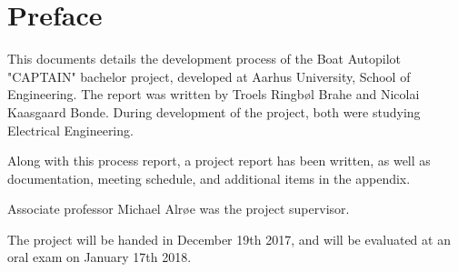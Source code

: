 \chapter{Preface}
This documents details the development process of the Boat Autopilot "CAPTAIN" bachelor project, developed at Aarhus University, School of Engineering. The report was written by Troels Ringbøl Brahe and Nicolai Kaasgaard Bonde. During development of the project, both were studying Electrical Engineering.

Along with this process report, a project report has been written, as well as documentation, meeting schedule, and additional items in the appendix.

Associate professor Michael Alrøe was the project supervisor.

The project will be handed in December 19th 2017, and will be evaluated at an oral exam on January 17th 2018.